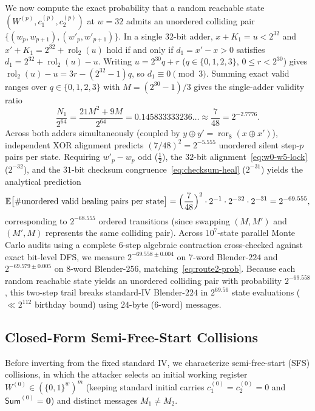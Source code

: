 \documentclass[11pt,a4paper]{article}
\theoremstyle{definition}
\theoremstyle{remark}
\newcommand{\ror}{\operatorname{ror}}
\newcommand{\rol}{\operatorname{rol}}
\newcommand{\SumAcc}{\mathsf{Sum}}
\begin{document}
We now compute the exact probability that a random reachable state $(W^{(p)}, c_1^{(p)}, c_2^{(p)})$ at $w = 32$ admits an unordered colliding pair $\{(w_p, w_{p+1}), (w'_p, w'_{p+1})\}$. In a single $32$-bit adder, $x + K_1 = u < 2^{32}$ and $x' + K_1 = 2^{32} + \rol_2(u)$ hold if and only if $d_1 = x' - x > 0$ satisfies $d_1 = 2^{32} + \rol_2(u) - u$. Writing $u = 2^{30} q + r$ ($q \in \{0,1,2,3\}$, $0 \le r < 2^{30}$) gives $\rol_2(u) - u = 3r - (2^{32} - 1)q$, so $d_1 \equiv 0 \pmod 3$. Summing exact valid ranges over $q \in \{0,1,2,3\}$ with $M = (2^{30} - 1)/3$ gives the single-adder validity ratio
\[
    \frac{N_1}{2^{64}} = \frac{21 M^2 + 9 M}{2^{64}} = 0.145833333236\dots \approx \frac{7}{48} = 2^{-2.7776}.
\]
Across both adders simultaneously (coupled by $y \oplus y' = \ror_8(x \oplus x')$), independent XOR alignment predicts $(7/48)^2 = 2^{-5.555}$ unordered silent step-$p$ pairs per state. Requiring $w'_p - w_p$ odd ($\frac{1}{2}$), the $32$-bit alignment~\eqref{eq:w0-w5-lock} ($2^{-32}$), and the $31$-bit checksum congruence~\eqref{eq:checksum-heal} ($2^{-31}$) yields the analytical prediction
\begin{equation}
    \mathbb{E}\bigl[\#\text{unordered valid healing pairs per state}\bigr]
    = \Bigl(\frac{7}{48}\Bigr)^2 \cdot 2^{-1} \cdot 2^{-32} \cdot 2^{-31} = 2^{-69.555},
    \label{eq:route2-prob}
\end{equation}
corresponding to $2^{-68.555}$ ordered transitions (since swapping $(M, M')$ and $(M', M)$ represents the same colliding pair). Across $10^7$-state parallel Monte Carlo audits using a complete $6$-step algebraic contraction cross-checked against exact bit-level DFS, we measure $2^{-69.558 \pm 0.004}$ on $7$-word Blender-$224$ and $2^{-69.579 \pm 0.005}$ on $8$-word Blender-$256$, matching~\eqref{eq:route2-prob}. Because each random reachable state yields an unordered colliding pair with probability $2^{-69.558}$, this two-step trail breaks standard-IV Blender-$224$ in $2^{69.56}$ state evaluations ($\ll 2^{112}$ birthday bound) using $24$-byte ($6$-word) messages.

\subsection{Closed-Form Semi-Free-Start Collisions}
\label{subsec:closed-form-sfs}
Before inverting from the fixed standard IV, we characterize semi-free-start (SFS) collisions, in which the attacker selects an initial working register $W^{(0)} \in (\{0,1\}^w)^m$ (keeping standard initial carries $c_1^{(0)} = c_2^{(0)} = 0$ and $\SumAcc^{(0)} = \mathbf{0}$) and distinct messages $M_1 \neq M_2$.
\end{document}
